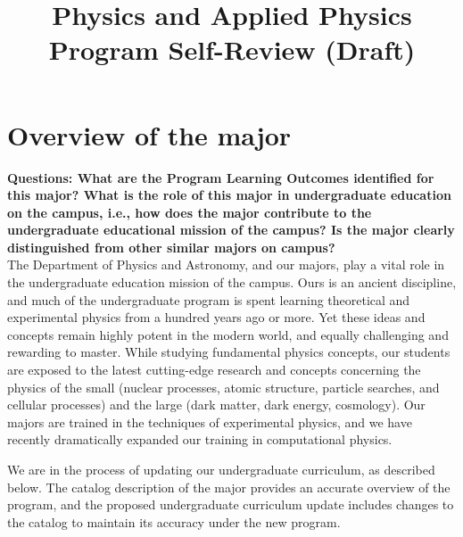 \documentclass[12pt]{article}
\begin{document}

\linenumbers

\title{Physics and Applied Physics \\ Program Self-Review (Draft)}

\maketitle

\newpage
\section{Overview of the major}
\label{sec:overview}

{\bf Questions: What are the Program Learning Outcomes identified for
  this major? What is the role of this major in undergraduate
  education on the campus, i.e., how does the major contribute to the
  undergraduate educational mission of the campus? Is the major
  clearly distinguished from other similar majors on campus?}\\[3pt]

\noindent
The Department of Physics and Astronomy, and our majors, play a vital
role in the undergraduate education mission of the campus.  Ours is an
ancient discipline, and much of the undergraduate program is spent
learning theoretical and experimental physics from a hundred years ago
or more.  Yet these ideas and concepts remain highly potent in the
modern world, and equally challenging and rewarding to master.  While
studying fundamental physics concepts, our students are exposed to the
latest cutting-edge research and concepts concerning the physics of
the small (nuclear processes, atomic structure, particle searches, and
cellular processes) and the large (dark matter, dark energy,
cosmology).  Our majors are trained in the techniques of experimental
physics, and we have recently dramatically expanded our training in
computational physics.

We are in the process of updating our undergraduate curriculum, as
described below.  The catalog description of the major provides an
accurate overview of the program, and the proposed undergraduate
curriculum update includes changes to the catalog to maintain its
accuracy under the new program.
\end{document}
